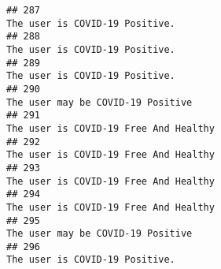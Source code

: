 \documentclass[
]{article}
\begin{document}
\begin{verbatim}
## 287                                                                                                                                                                                                                                     The user is COVID-19 Positive.
## 288                                                                                                                                                                                                                                     The user is COVID-19 Positive.
## 289                                                                                                                                                                                                                                     The user is COVID-19 Positive.
## 290                                                                                                                                                                                                                                  The user may be COVID-19 Positive
## 291                                                                                                                                                                                                                              The user is COVID-19 Free And Healthy
## 292                                                                                                                                                                                                                              The user is COVID-19 Free And Healthy
## 293                                                                                                                                                                                                                              The user is COVID-19 Free And Healthy
## 294                                                                                                                                                                                                                              The user is COVID-19 Free And Healthy
## 295                                                                                                                                                                                                                                  The user may be COVID-19 Positive
## 296                                                                                                                                                                                                                                     The user is COVID-19 Positive.

\end{verbatim}
\end{document}
